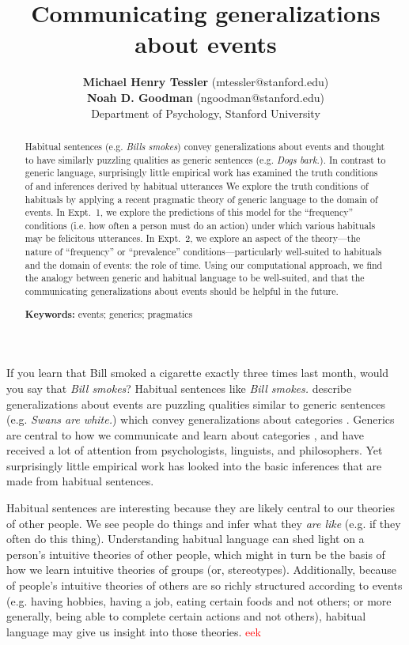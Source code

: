 \documentclass[10pt,letterpaper]{article}
\title{Communicating generalizations about events}
\author{{\large \bf Michael Henry Tessler} (mtessler@stanford.edu) \\
 {\large \bf Noah D. Goodman} (ngoodman@stanford.edu) \\
  Department of Psychology, Stanford University}
\newcommand{\red}[1]{\textcolor{Red}{#1}}
\begin{document}
\maketitle


\begin{abstract}
Habitual sentences (e.g. \emph{Bills smokes}) convey generalizations about events and thought to have similarly puzzling qualities as generic sentences (e.g. \emph{Dogs bark.}). 
In contrast to generic language, surprisingly little empirical work has examined the truth conditions of and inferences derived by habitual utterances 
We explore the truth conditions of habituals by applying a recent pragmatic theory of generic language to the domain of events.
In Expt.~1, we explore the predictions of this model for the ``frequency'' conditions (i.e. how often a person must do an action) under which various habituals may be felicitous utterances. 
In Expt.~2, we explore an aspect of the theory---the nature of ``frequency'' or ``prevalence'' conditions---particularly well-suited to habituals and the domain of events: the role of time.
Using our computational approach, we find the analogy between generic and habitual language to be well-suited, and that the communicating generalizations about events should be helpful in the future.


\textbf{Keywords:} 
events; generics; pragmatics
\end{abstract}


If you learn that Bill smoked a cigarette exactly three times last month, would you say that \emph{Bill smokes}?
Habitual sentences like \emph{Bill smokes.} describe generalizations about events are puzzling qualities similar to generic sentences (e.g. \emph{Swans are white.}) which convey generalizations about categories \cite{Carlson2005}.
Generics are central to how we communicate and learn about categories \cite{Carlson1977, Gelman2004}, and have received a lot of attention from psychologists, linguists, and philosophers.
Yet surprisingly little empirical work has looked into the basic inferences that are made from habitual sentences.

Habitual sentences are interesting because they are likely central to our theories of other people. 
We see people do things and infer what they \emph{are like} (e.g. if they often do this thing). 
Understanding habitual language can shed light on a person's intuitive theories of other people, which might in turn be the basis of how we learn intuitive theories of groups (or, stereotypes). 
Additionally, because of people's intuitive theories of others are so richly structured according to events (e.g. having hobbies, having a job, eating certain foods and not others; or more generally, being able to complete certain actions and not others),
habitual language may give us insight into those theories. \red{eek}
\end{document}
